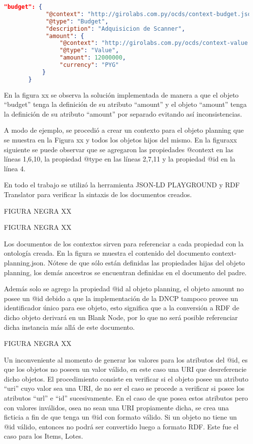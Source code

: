     \begin{lstlisting}[captionpos=b, caption=Objeto JSON-LD , label=lst:oJsonLd, language=json,firstnumber=1]
        "budget": {
            "@context": "http://girolabs.com.py/ocds/context-budget.json",
            "@type": "Budget",
            "description": "Adquisicion de Scanner",
            "amount": {
                "@context": "http://girolabs.com.py/ocds/context-value.json",
                "@type": "Value",
                "amount": 12000000,
                "currency": "PYG"
           }
       }   
        \end{lstlisting}
    

        En la figura xx se observa la solución implementada de manera a que el objeto “budget” tenga la definición de su atributo “amount” y el objeto “amount” tenga la definición de su atributo “amount” por separado evitando así inconsistencias.

A modo de ejemplo, se procedió a crear un contexto para el objeto planning que se muestra en la Figura xx y todos los objetos hijos del mismo. En la figuraxx siguiente se puede observar que se agregaron las propiedades @context en las líneas 1,6,10, la propiedad @type en las líneas 2,7,11 y la propiedad @id en la línea 4.

En todo el trabajo se utilizó la herramienta JSON-LD PLAYGROUND  y RDF Translator para verificar la sintaxis de los documentos creados.


FIGURA NEGRA XX

FIGURA NEGRA XX


Los documentos de los contextos sirven para referenciar a cada propiedad con la ontología creada. En la figura se muestra el contenido del documento context-planning.json. Nótese de que sólo están definidas las propiedades hijas del objeto planning, los demás ancestros se encuentran definidas en el documento del padre.

Además solo se agrego la propiedad @id al objeto planning, el objeto amount no posee un @id debido a que la implementación de la DNCP tampoco provee un identificador único para ese objeto, esto significa que a la conversión a RDF de dicho objeto derivará en un Blank Node, por lo que no será posible referenciar dicha instancia más allá de este documento.


FIGURA NEGRA XX


Un inconveniente al momento de generar los valores para los atributos del @id, es que los objetos no poseen un valor válido, en este caso una URI que desreferencie dicho objetos. El procedimiento consiste en verificar si el objeto posee un atributo “uri” cuyo valor sea una URI, de no ser el caso se procede a verificar si posee los atributos “url” e “id” sucesivamente. En el caso de que posea estos atributos pero con valores inválidos, osea no sean una URI propiamente dicha, se crea una ficticia a fin de que tenga un @id con formato válido. Si un objeto no tiene un @id válido, entonces no podrá ser convertido luego a formato RDF. Este fue el caso para los Items, Lotes.

